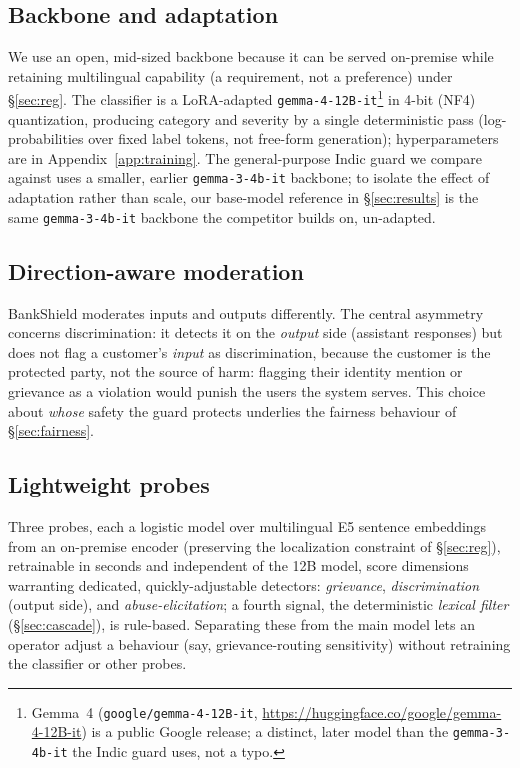 \documentclass[11pt]{article}
\begin{document}
\subsection{Backbone and adaptation}
\label{sec:backbone}

We use an open, mid-sized backbone because it can be served on-premise while retaining multilingual capability (a requirement, not a preference) under \S\ref{sec:reg}. The classifier is a LoRA-adapted \texttt{gemma-4-12B-it}\footnote{Gemma~4 (\texttt{google/gemma-4-12B-it}, \url{https://huggingface.co/google/gemma-4-12B-it}) is a public Google release; a distinct, later model than the \texttt{gemma-3-4b-it} the Indic guard uses, not a typo.} in 4-bit (NF4) quantization, producing category and severity by a single deterministic pass (log-probabilities over fixed label tokens, not free-form generation); hyperparameters are in Appendix~\ref{app:training}. The general-purpose Indic guard we compare against uses a smaller, earlier \texttt{gemma-3-4b-it} backbone; to isolate the effect of adaptation rather than scale, our base-model reference in \S\ref{sec:results} is the same \texttt{gemma-3-4b-it} backbone the competitor builds on, un-adapted.

\subsection{Direction-aware moderation}
\label{sec:direction}

BankShield moderates inputs and outputs differently. The central asymmetry concerns discrimination: it detects it on the \emph{output} side (assistant responses) but does not flag a customer's \emph{input} as discrimination, because the customer is the protected party, not the source of harm: flagging their identity mention or grievance as a violation would punish the users the system serves. This choice about \emph{whose} safety the guard protects underlies the fairness behaviour of \S\ref{sec:fairness}.

\subsection{Lightweight probes}
\label{sec:probes}

Three probes, each a logistic model over multilingual E5 sentence embeddings \citep{wang2024e5} from an on-premise encoder (preserving the localization constraint of \S\ref{sec:reg}), retrainable in seconds and independent of the 12B model, score dimensions warranting dedicated, quickly-adjustable detectors: \emph{grievance}, \emph{discrimination} (output side), and \emph{abuse-elicitation}; a fourth signal, the deterministic \emph{lexical filter} (\S\ref{sec:cascade}), is rule-based. Separating these from the main model lets an operator adjust a behaviour (say, grievance-routing sensitivity) without retraining the classifier or other probes.
\end{document}
